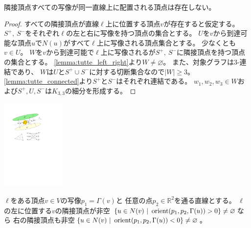 \begin{lemma}
\label{lemma:tutte_collinear}
隣接頂点すべての写像が同一直線上に配置される頂点は存在しない。
\end{lemma}

\begin{paracol}{2}
\begin{proof}
すべての隣接頂点が直線$\ell$上に位置する頂点$v$が存在すると仮定する。
$S^+,~ S^-$をそれぞれ$\ell$の左と右に写像を持つ頂点の集合とする。
$U$を$v$から到達可能な頂点$u$で$N(u)$がすべて$\ell$上に写像される頂点集合とする。
少なくとも$v \in U$。
$W$を$v$から到達可能で$\ell$上に写像されるが$S^+,~ S^-$に隣接頂点を持つ頂点の集合とする。
\cref{lemma:tutte_left_right}より$W\neq \varnothing$。
また、対象グラフは$3$-連結であり、
$W$は$U$と$S^+\cup S^-$に対する切断集合なので$|W|\geq 3$。
\cref{lemma:tutte_connected}より$S^+$と$S^-$はそれぞれ連結である。
$w_1, w_2, w_3 \in W$および$S^+, U, S^-$は$K_{3,3}$の細分を形成する。
\end{proof}
\switchcolumn
\vspace{-1.5\intextsep}
\centering
\includegraphics[width=0.24\textwidth]{figures/tutte_collinear.pdf}
\end{paracol}










\begin{lemma}
\label{lemma:tutte_left_right}
$\ell$をある頂点$v \in V$の写像$p_1 = \Gamma(v)$と
任意の点$p_2 \in \mathbb{R}^2$を通る直線とする。
$\ell$の左に位置する$v$の隣接頂点が非空
$\{u \in N(v) ~|~ \operatorname{orient}(p_1, p_2, \Gamma(u)) > 0\} \neq \varnothing$なら
右の隣接頂点も非空$\{u \in N(v) ~|~ \operatorname{orient}(p_1, p_2, \Gamma(u)) < 0\} \neq \varnothing$。
\end{lemma}

